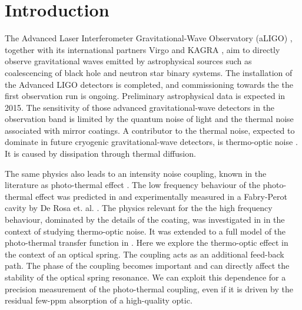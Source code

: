 \newcommand{\irm}{\mathrm{i}}

\newcommand{\del}[0]{{}_{{}^\triangle}\!}
\newcommand{\vk}[0]{{\bf k}}
\newcommand{\w}[0]{{\rm w}}
\newcommand{\omg}[0]{{{\Omega}}}
\newcommand{\eq}[1]{equation \ref{#1}}

\section{Introduction}
The Advanced Laser Interferometer Gravitational-Wave Observatory (aLIGO) \cite{Harry2010}, together with its international partners Virgo \cite{2013ASPC..467..151D} and KAGRA \cite{Somiya:2011np}, aim to directly observe gravitational waves emitted by astrophysical sources such as coalescencing of black hole and neutron star binary systems. The installation 
of the Advanced LIGO detectors is completed, and commissioning towards the the first observation run is ongoing. Preliminary astrophysical data is expected in 2015. The sensitivity of those advanced gravitational-wave detectors in the observation band is limited by the quantum noise of light and the thermal noise associated with mirror coatings. A contributor to the thermal noise, expected to dominate in future cryogenic gravitational-wave detectors, is thermo-optic noise \cite{Braginsky2000303, PhysRevD.63.082003, PhysRevD.78.102003}. It is caused by dissipation through thermal diffusion.

The same physics also leads to an intensity noise coupling, known in the literature as photo-thermal effect \cite{Braginsky19991}. The low frequency behaviour of the photo-thermal effect was predicted in \cite{PhysRevD.63.082003} and experimentally measured in a Fabry-Perot cavity by De Rosa et. al. \cite{PhysRevLett.89.237402}. The physics relevant for the the high frequency behaviour, dominated by the details of the coating, was investigated in \cite{PhysRevD.78.102003} in the context of studying thermo-optic noise. It was extended to a full model of the photo-thermal transfer function in \cite{PhysRevD.91.023010}.
Here we explore the thermo-optic effect in the context of an optical spring. The coupling acts as an additional feed-back path. The phase of the coupling becomes important and can directly affect the stability of the optical spring resonance. We can exploit this dependence for a precision measurement of the photo-thermal coupling, even if it is driven by the residual few-ppm absorption of a high-quality optic.

